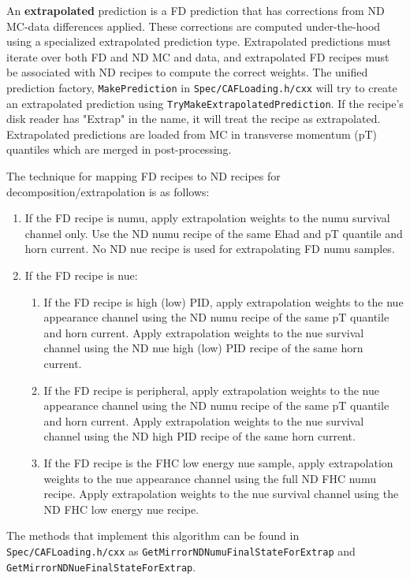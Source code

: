 \documentclass{article}
\begin{document}
An \textbf{extrapolated} prediction is a FD prediction that has corrections from ND MC-data differences applied. These corrections are computed under-the-hood using a specialized extrapolated prediction type.
Extrapolated predictions must iterate over both FD and ND MC and data, and extrapolated FD recipes must be associated with ND recipes to compute the correct weights.
The unified prediction factory, \texttt{Make\-Prediction} in \texttt{Spec/\-CAFLoading\-.h/cxx} will try to create an extrapolated prediction using \texttt{Try\-Make\-Extrapolated\-Prediction}.
If the recipe's disk reader has "Extrap" in the name, it will treat the recipe as extrapolated. Extrapolated predictions are loaded from MC in transverse momentum (pT) quantiles which are merged in post-processing.

The technique for mapping FD recipes to ND recipes for decomposition/extrapolation is as follows:
\begin{enumerate}
  \item If the FD recipe is numu, apply extrapolation weights to the numu survival channel only. Use the ND numu recipe of the same Ehad and pT quantile and horn current. No ND nue recipe is used for extrapolating FD numu samples.
  \item If the FD recipe is nue:
  \begin{enumerate}
    \item If the FD recipe is high (low) PID, apply extrapolation weights to the nue appearance channel using the ND numu recipe of the same pT quantile and horn current. Apply extrapolation weights to the nue survival channel using the ND nue high (low) PID recipe of the same horn current.
    \item If the FD recipe is peripheral, apply extrapolation weights to the nue appearance channel using the ND numu recipe of the same pT quantile and horn current. Apply extrapolation weights to the nue survival channel using the ND high PID recipe of the same horn current.
    \item If the FD recipe is the FHC low energy nue sample, apply extrapolation weights to the nue appearance channel using the full ND FHC numu recipe. Apply extrapolation weights to the nue survival channel using the ND FHC low energy nue recipe.
  \end{enumerate}
\end{enumerate}
The methods that implement this algorithm can be found in \texttt{Spec/\-CAFLoading.h/cxx} as \texttt{Get\-Mirror\-ND\-Numu\-Final\-State\-For\-Extrap} and \texttt{Get\-Mirror\-ND\-Nue\-Final\-State\-For\-Extrap}.
\end{document}

